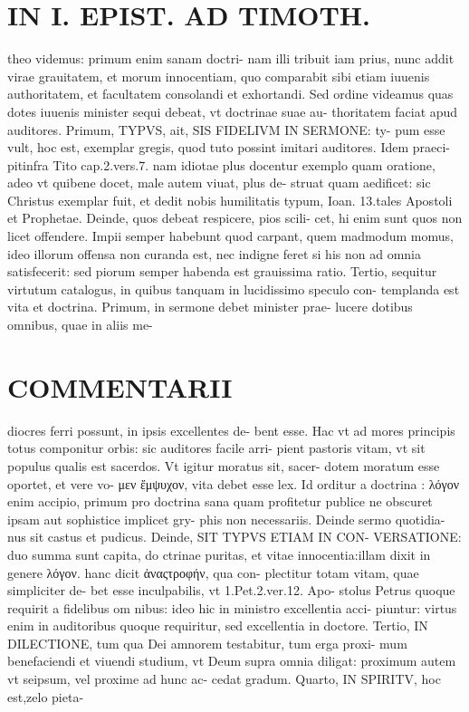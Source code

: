 \documentclass{article}
\begin{document}
\begin{pages}
\section*{IN I. EPIST. AD TIMOTH. }
\marginpar{[ p.107 ]}\pstart theo videmus: primum enim sanam doctri- nam illi tribuit iam prius, nunc addit virae grauitatem, et morum innocentiam, quo comparabit sibi etiam iuuenis authoritatem, et facultatem consolandi et exhortandi.  \pend\pstart Sed ordine videamus quas dotes iuuenis minister sequi debeat, vt doctrinae suae au- thoritatem faciat apud auditores. Primum, TYPVS, ait, SIS FIDELIVM IN SERMONE: ty- pum esse vult, hoc est, exemplar gregis, quod tuto possint imitari auditores. Idem praeci- pitinfra Tito cap.2.vers.7. nam idiotae plus docentur exemplo quam oratione, adeo vt quibene docet, male autem viuat, plus de- struat quam aedificet: sic Christus exemplar fuit, et dedit nobis humilitatis typum, Ioan. 13.tales Apostoli et Prophetae.  \pend\pstart Deinde, quos debeat respicere, pios scili- cet, hi enim sunt quos non licet offendere. Impii semper habebunt quod carpant, quem madmodum momus, ideo illorum offensa non curanda est, nec indigne feret si his non ad omnia satisfecerit: sed piorum semper habenda est grauissima ratio.  \pend\pstart Tertio, sequitur virtutum catalogus, in quibus tanquam in lucidissimo speculo con- templanda est vita et doctrina.  \pend\pstart Primum, in sermone debet minister prae- lucere dotibus omnibus, quae in aliis me-  \pend
\section*{COMMENTARII }
\marginpar{[ p.108 ]}\pstart diocres ferri possunt, in ipsis excellentes de- bent esse. Hac vt ad mores principis totus componitur orbis: sic auditores facile arri- pient pastoris vitam, vt sit populus qualis est sacerdos. Vt igitur moratus sit, sacer- dotem moratum esse oportet, et vere vo- μεν ἔμψυχον, vita debet esse lex. Id orditur a doctrina : λόγον enim accipio, primum pro doctrina sana quam profitetur publice ne obscuret ipsam aut sophistice implicet gry- phis non necessariis. Deinde sermo quotidia- nus sit castus et pudicus.  \pend\pstart Deinde, SIT TYPVS ETIAM IN CON- VERSATIONE: duo summa sunt capita, do ctrinae puritas, et vitae innocentia:illam dixit in genere λόγον. hanc dicit ἀναςτροφήν, qua con- plectitur totam vitam, quae simpliciter de- bet esse inculpabilis, vt 1.Pet.2.ver.12. Apo- stolus Petrus quoque requirit a fidelibus om nibus: ideo hic in ministro excellentia acci- piuntur: virtus enim in auditoribus quoque requiritur, sed excellentia in doctore.  \pend\pstart Tertio, IN DILECTIONE, tum qua Dei amnorem testabitur, tum erga proxi- mum benefaciendi et viuendi studium, vt Deum supra omnia diligat: proximum autem vt seipsum, vel proxime ad hunc ac- cedat gradum.  \pend\pstart Quarto, IN SPIRITV, hoc est,zelo pieta-  \pend

\end{pages}
\end{document}
